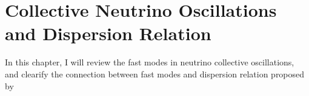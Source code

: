 
\chapter{\label{chap:dr}Collective Neutrino Oscillations and Dispersion Relation}


In this chapter, I will review the fast modes in neutrino collective oscillations, and clearify the connection between fast modes and dispersion relation proposed by 